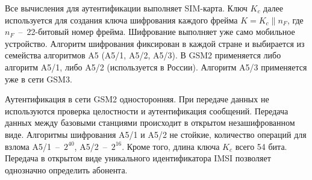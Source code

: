Все вычисления для аутентификации выполняет SIM-карта. Ключ $K_c$ далее используется для создания ключа шифрования каждого фрейма $K = K_c \| n_F$, где $n_F$~--~22-битовый номер фрейма. Шифрование выполняет уже само мобильное устройство. Алгоритм шифрования фиксирован в каждой стране и выбирается из семейства алгоритмов A5 (A5/1, A5/2, A5/3). В GSM2 применяется либо алгоритм A5/1, либо A5/2 (используется в России). Алгоритм A5/3 применяется уже в сети GSM3.

Аутентификация в сети GSM2 односторонняя. При передаче данных не используются проверка целостности и аутентификация сообщений. Передача данных между базовыми станциями происходит в открытом незашифрованном виде. Алгоритмы шифрования A5/1 и A5/2 не стойкие, количество операций для взлома A5/1~--~$2^{40}$, A5/2~--~$2^{16}$. Кроме того, длина ключа $K_c$ всего 54 бита. Передача в открытом виде уникального идентификатора IMSI позволяет однозначно определить абонента.
